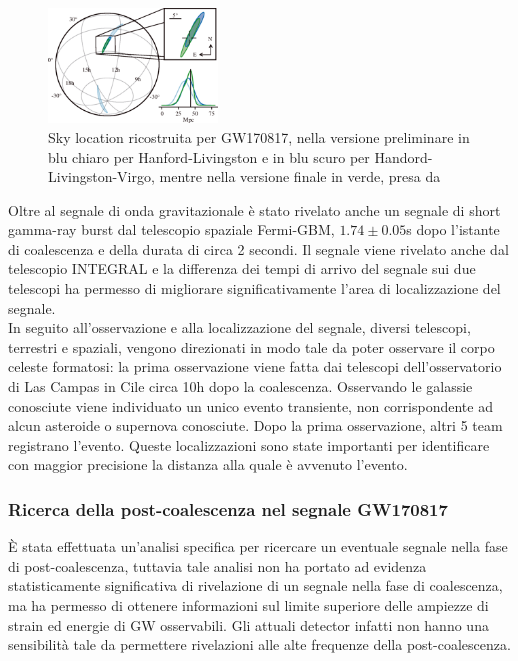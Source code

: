 \begin{figure}
	\vspace{-15pt}
	\begin{center}
		\includegraphics[width=0.4\textwidth]{figures/Capitolo_1/skymap.png}
	\end{center}
	\vspace{-5pt}
	\caption{Sky location ricostruita per GW170817, nella versione preliminare in blu chiaro per Hanford-Livingston e in blu scuro per Handord-Livingston-Virgo, mentre nella versione finale in verde, presa da \cite{Abbott_2019}}
	\label{fig:skymap}
	\vspace{-15pt}
\end{figure}
Oltre al segnale di onda gravitazionale è stato rivelato anche un segnale di short gamma-ray burst dal telescopio spaziale Fermi-GBM, $1.74\pm0.05$s dopo l'istante di coalescenza e della durata di circa 2 secondi. Il segnale viene rivelato anche dal telescopio INTEGRAL e la differenza dei tempi di arrivo del segnale sui due telescopi ha permesso di migliorare significativamente l'area di localizzazione del segnale.\\
In seguito all'osservazione e alla localizzazione del segnale, diversi telescopi, terrestri e spaziali, vengono direzionati in modo tale da poter osservare il corpo celeste formatosi: la prima osservazione viene fatta dai telescopi dell'osservatorio di Las Campas in Cile circa 10h dopo la coalescenza. Osservando le galassie conosciute viene individuato un unico evento transiente, non corrispondente ad alcun asteroide o supernova conosciute. Dopo la prima osservazione, altri 5 team registrano l'evento. Queste localizzazioni sono state importanti per identificare con maggior precisione la distanza alla quale è avvenuto l'evento\cite{Abbott_2017c}.
\subsubsection{Ricerca della post-coalescenza nel segnale GW170817}
\label{section:postmergerGW170817}
È stata effettuata un'analisi specifica per ricercare un eventuale segnale nella fase di post-coalescenza, tuttavia tale analisi non ha portato ad evidenza statisticamente significativa di rivelazione di un segnale nella fase di coalescenza, ma ha permesso di ottenere informazioni sul limite superiore delle ampiezze di strain ed energie di GW osservabili. Gli attuali detector infatti non hanno una sensibilità tale da permettere rivelazioni alle alte frequenze della post-coalescenza.

